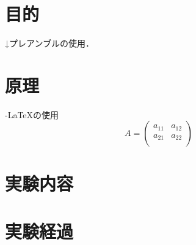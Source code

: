 
\section{目的}

↓プレアンブルの使用．\\
\mami

\section{原理}
\AmS-\LaTeX の使用
\begin{equation} \label{matrix}
    A = \begin{pmatrix}
        a_{11} & a_{12} \\
        a_{21} & a_{22} \\
    \end{pmatrix}
\end{equation}

\section{実験内容}

\section{実験経過}
